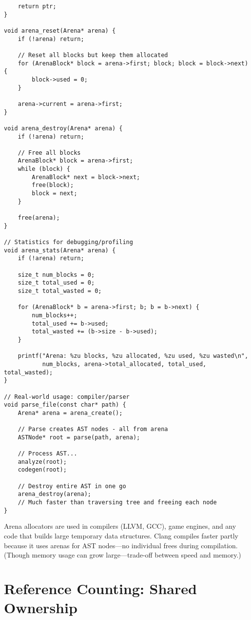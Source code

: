 \begin{lstlisting}
    return ptr;
}

void arena_reset(Arena* arena) {
    if (!arena) return;

    // Reset all blocks but keep them allocated
    for (ArenaBlock* block = arena->first; block; block = block->next) {
        block->used = 0;
    }

    arena->current = arena->first;
}

void arena_destroy(Arena* arena) {
    if (!arena) return;

    // Free all blocks
    ArenaBlock* block = arena->first;
    while (block) {
        ArenaBlock* next = block->next;
        free(block);
        block = next;
    }

    free(arena);
}

// Statistics for debugging/profiling
void arena_stats(Arena* arena) {
    if (!arena) return;

    size_t num_blocks = 0;
    size_t total_used = 0;
    size_t total_wasted = 0;

    for (ArenaBlock* b = arena->first; b; b = b->next) {
        num_blocks++;
        total_used += b->used;
        total_wasted += (b->size - b->used);
    }

    printf("Arena: %zu blocks, %zu allocated, %zu used, %zu wasted\n",
           num_blocks, arena->total_allocated, total_used, total_wasted);
}

// Real-world usage: compiler/parser
void parse_file(const char* path) {
    Arena* arena = arena_create();

    // Parse creates AST nodes - all from arena
    ASTNode* root = parse(path, arena);

    // Process AST...
    analyze(root);
    codegen(root);

    // Destroy entire AST in one go
    arena_destroy(arena);
    // Much faster than traversing tree and freeing each node
}
\end{lstlisting}

\begin{notebox}
Arena allocators are used in compilers (LLVM, GCC), game engines, and any code that builds large temporary data structures. Clang compiles faster partly because it uses arenas for AST nodes---no individual frees during compilation. (Though memory usage can grow large---trade-off between speed and memory.)
\end{notebox}

\section{Reference Counting: Shared Ownership}

